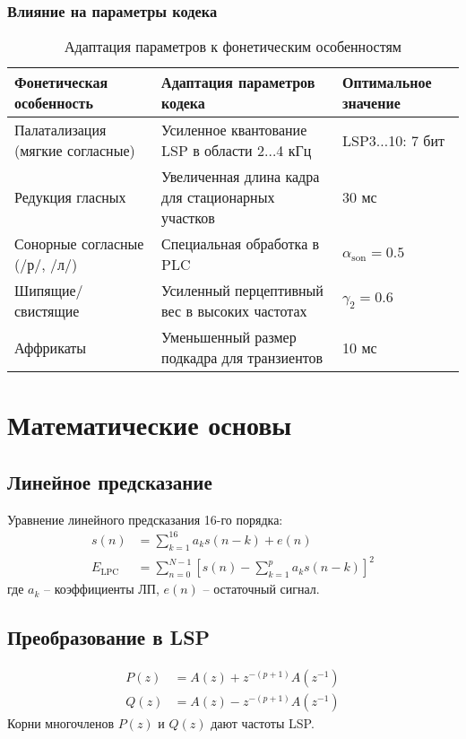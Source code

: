 \documentclass{report}
\begin{document}
	\subsection{Влияние на параметры кодека}
	\begin{table}[H]
		\centering
		\caption{Адаптация параметров к фонетическим особенностям}
		\begin{tabular}{p{4cm}p{6cm}p{3cm}}
			\toprule
			\textbf{Фонетическая особенность} & \textbf{Адаптация параметров кодека} & \textbf{Оптимальное значение} \\
			\midrule
			Палатализация (мягкие согласные) & Усиленное квантование LSP в области 2$\ldots$4 кГц & LSP3$\ldots$10: 7 бит \\
			Редукция гласных & Увеличенная длина кадра для стационарных участков & 30 мс \\
			Сонорные согласные (/р/, /л/) & Специальная обработка в PLC & $\alpha_{\text{son}} = 0.5$ \\
			Шипящие/свистящие & Усиленный перцептивный вес в высоких частотах & $\gamma_2 = 0.6$ \\
			Аффрикаты & Уменьшенный размер подкадра для транзиентов & 10 мс \\
			\bottomrule
		\end{tabular}
	\end{table}
	
	\chapter{Математические основы}
	\section{Линейное предсказание}
	Уравнение линейного предсказания 16-го порядка:
	\begin{align}
		s(n) &= \sum_{k=1}^{16} a_k s(n-k) + e(n) \\
		E_{\text{LPC}} &= \sum_{n=0}^{N-1} \left[ s(n) - \sum_{k=1}^{p} a_k s(n-k) \right]^2
	\end{align}
	где $a_k$ -- коэффициенты ЛП, $e(n)$ -- остаточный сигнал.
	
	\section{Преобразование в LSP}
	\begin{align}
		P(z) &= A(z) + z^{-(p+1)}A(z^{-1}) \\
		Q(z) &= A(z) - z^{-(p+1)}A(z^{-1})
	\end{align}
	Корни многочленов $P(z)$ и $Q(z)$ дают частоты LSP.
	
\end{document}
